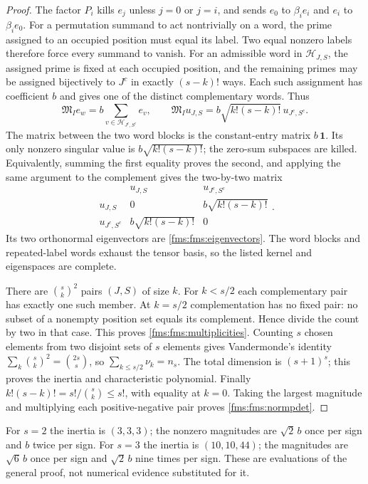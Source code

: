 \documentclass[11pt,a4paper]{article}
\theoremstyle{definition}\newtheorem{definition}[theorem]{Definition}
\begin{document}
\begin{proof}
The factor $P_i$ kills $e_j$ unless $j=0$ or $j=i$,
and sends $e_0$ to $\beta_i e_i$ and $e_i$ to $\beta_i e_0$.
For a permutation summand to act nontrivially on a word, the prime
assigned to an occupied position must equal its label.
Two equal nonzero labels therefore force every summand to vanish.
For an admissible word in $\mathcal H_{J,S}$, the assigned prime
is fixed at each occupied position, and the remaining primes may
be assigned bijectively to $J^c$ in exactly $(s-k)!$ ways.
Each such assignment has coefficient $b$ and gives one of the
distinct complementary words. Thus
\begin{equation}\tag{FMS29}\label{fms:fms:blockmap}
 \mathfrak M_I e_w=
 b\sum_{v\in\mathcal H_{J^c,S^c}}e_v,\qquad
 \mathfrak M_Iu_{J,S}
       =b\sqrt{k!(s-k)!}\,u_{J^c,S^c}.
\end{equation}
The matrix between the two word blocks is the constant-entry
matrix $b\,\mathbf1$. Its only nonzero singular value is
$b\sqrt{k!(s-k)!}$; the zero-sum subspaces are killed.
Equivalently, summing the first equality proves the second,
and applying the same argument to the complement gives the
two-by-two matrix
\[
 \begin{array}{c|cc}
 &u_{J,S}&u_{J^c,S^c}\\ \hline
 u_{J,S}&0&b\sqrt{k!(s-k)!}\\
 u_{J^c,S^c}&b\sqrt{k!(s-k)!}&0
 \end{array}.
\]
Its two orthonormal eigenvectors are \eqref{fms:fms:eigenvectors}.
The word blocks and repeated-label words exhaust the tensor
basis, so the listed kernel and eigenspaces are complete.

There are $\binom{s}{k}^2$ pairs $(J,S)$ of size $k$.
For $k<s/2$ each complementary pair has exactly one such member.
At $k=s/2$ complementation has no fixed pair: no subset of a
nonempty position set equals its complement. Hence divide the
count by two in that case. This proves \eqref{fms:fms:multiplicities}.
Counting $s$ chosen elements from two disjoint sets of $s$
elements gives Vandermonde's identity
$\sum_k\binom{s}{k}^2=\binom{2s}{s}$, so
$\sum_{k\le s/2}\nu_k=n_s$.
The total dimension is $(s+1)^s$; this proves the inertia and
characteristic polynomial. Finally
$k!(s-k)!=s!/\binom{s}{k}\le s!$, with equality at $k=0$.
Taking the largest magnitude and multiplying each positive-negative
pair proves \eqref{fms:fms:normpdet}.
\end{proof}

For $s=2$ the inertia is $(3,3,3)$; the nonzero magnitudes
are $\sqrt2\,b$ once per sign and $b$ twice per sign.
For $s=3$ the inertia is $(10,10,44)$; the magnitudes are
$\sqrt6\,b$ once per sign and $\sqrt2\,b$ nine times per sign.
These are evaluations of the general proof, not numerical evidence
substituted for it.
\end{document}
